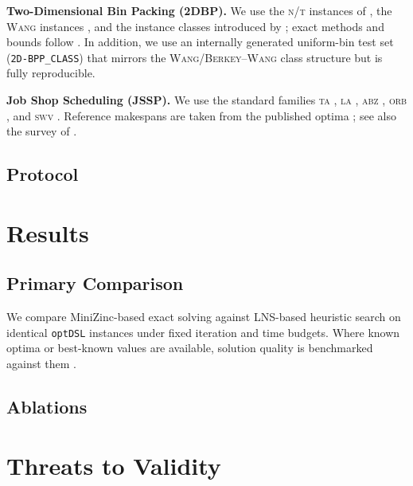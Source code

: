 \documentclass[11pt,a4paper]{article}
\begin{document}
\textbf{Two-Dimensional Bin Packing (2DBP).}
We use the \textsc{n/t} instances of \citet{hopper2001genetic,hopper2001ejor}, the \textsc{Wang} instances \citep{wang1983}, and the instance classes introduced by \citet{berkey1987}; exact methods and bounds follow \citet{lodi2002twodimensional,martello1998exact}.
In addition, we use an internally generated uniform-bin test set (\texttt{2D-BPP\_CLASS}) that mirrors the \textsc{Wang}/\textsc{Berkey--Wang} class structure but is fully reproducible.

\textbf{Job Shop Scheduling (JSSP).}
We use the standard families \textsc{ta} \citep{taillard1993benchmarks}, \textsc{la} \citep{lawrence1984}, \textsc{abz} \citep{adams1988shifting}, \textsc{orb} \citep{applegate1991}, and \textsc{swv} \citep{storer1992}.
Reference makespans are taken from the published optima \citep{applegate1991,nowicki1996fast,taillard1993benchmarks}; see also the survey of \citet{jain1999jssp}.


\subsection{Protocol}

\section{Results}
\subsection{Primary Comparison}
We compare MiniZinc-based exact solving against LNS-based heuristic search on identical \texttt{optDSL} instances under fixed iteration and time budgets.
Where known optima or best-known values are available, solution quality is benchmarked against them \citep{applegate1991,nowicki1996fast,taillard1993benchmarks,uchoa2017cvrplib,martello1998exact}.

\subsection{Ablations}

\section{Threats to Validity}
\end{document}
